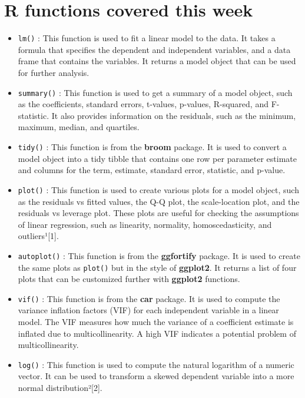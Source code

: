 \documentclass[
]{book}
\providecommand{\tightlist}{%
  \setlength{\itemsep}{0pt}\setlength{\parskip}{0pt}}
\begin{document}
\hypertarget{r-functions-covered-this-week-1}{%
\section{R functions covered this week}\label{r-functions-covered-this-week-1}}

\begin{itemize}
\tightlist
\item
  \texttt{lm()} : This function is used to fit a linear model to the data. It takes a formula that specifies the dependent and independent variables, and a data frame that contains the variables. It returns a model object that can be used for further analysis.
\item
  \texttt{summary()} : This function is used to get a summary of a model object, such as the coefficients, standard errors, t-values, p-values, R-squared, and F-statistic. It also provides information on the residuals, such as the minimum, maximum, median, and quartiles.
\item
  \texttt{tidy()} : This function is from the \textbf{broom} package. It is used to convert a model object into a tidy tibble that contains one row per parameter estimate and columns for the term, estimate, standard error, statistic, and p-value.
\item
  \texttt{plot()} : This function is used to create various plots for a model object, such as the residuals vs fitted values, the Q-Q plot, the scale-location plot, and the residuals vs leverage plot. These plots are useful for checking the assumptions of linear regression, such as linearity, normality, homoscedasticity, and outliers¹{[}1{]}.
\item
  \texttt{autoplot()} : This function is from the \textbf{ggfortify} package. It is used to create the same plots as \texttt{plot()} but in the style of \textbf{ggplot2}. It returns a list of four plots that can be customized further with \textbf{ggplot2} functions.
\item
  \texttt{vif()} : This function is from the \textbf{car} package. It is used to compute the variance inflation factors (VIF) for each independent variable in a linear model. The VIF measures how much the variance of a coefficient estimate is inflated due to multicollinearity. A high VIF indicates a potential problem of multicollinearity.
\item
  \texttt{log()} : This function is used to compute the natural logarithm of a numeric vector. It can be used to transform a skewed dependent variable into a more normal distribution²{[}2{]}.

\end{itemize}
\end{document}

